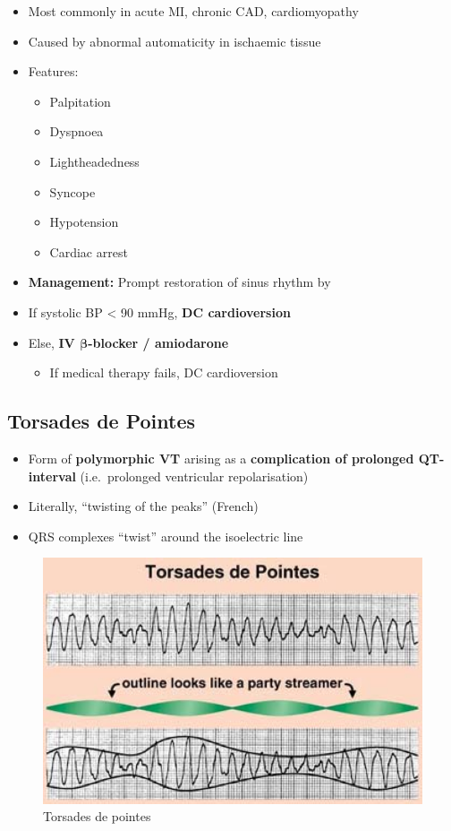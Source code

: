 \documentclass[
  12pt,
]{memoir}
\providecommand{\tightlist}{%
  \setlength{\itemsep}{0pt}\setlength{\parskip}{0pt}}
\begin{document}
\begin{itemize}
\tightlist
\item
  Most commonly in acute MI, chronic CAD, cardiomyopathy
\item
  Caused by abnormal automaticity in ischaemic tissue
\item
  Features:

  \begin{itemize}
  \tightlist
  \item
    Palpitation
  \item
    Dyspnoea
  \item
    Lightheadedness
  \item
    Syncope
  \item
    Hypotension
  \item
    Cardiac arrest
  \end{itemize}
\item
  \textbf{Management:} Prompt restoration of sinus rhythm by
\item
  If systolic BP \textless{} 90 mmHg, \textbf{DC cardioversion}
\item
  Else, \textbf{IV \(\boldsymbol\beta\)-blocker / amiodarone}

  \begin{itemize}
  \tightlist
  \item
    If medical therapy fails, DC cardioversion
  \end{itemize}
\end{itemize}

\hypertarget{torsades-de-pointes}{%
\subsection{Torsades de Pointes}\label{torsades-de-pointes}}

\begin{itemize}
\tightlist
\item
  Form of \textbf{polymorphic VT} arising as a \textbf{complication of
  prolonged QT- interval} (i.e.~prolonged ventricular repolarisation)
\item
  Literally, ``twisting of the peaks'' (French)
\item
  QRS complexes ``twist'' around the isoelectric line
\end{itemize}

\begin{figure}[h!]
    \centering
    \includegraphics[width=.7\textwidth]{../assets/med/torsades.png}
    \vspace{4mm}
    \caption{Torsades de pointes}
\end{figure}
\end{document}

